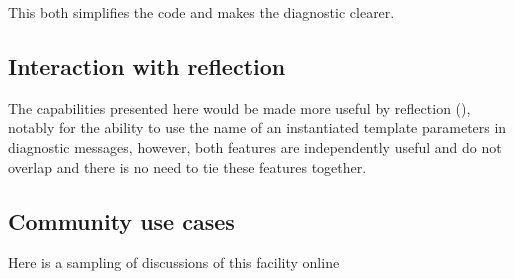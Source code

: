 \documentclass{wg21}
\begin{document}
This both simplifies the code and makes the diagnostic clearer.


\subsection{Interaction with reflection}

The capabilities presented here would be made more useful by reflection (), notably for the ability to use the name of an instantiated template parameters
in diagnostic messages, however, both features are independently useful and do not overlap and there is no need to tie these features together.

\subsection{Community use cases}

Here is a sampling of discussions of this facility online
\end{document}
